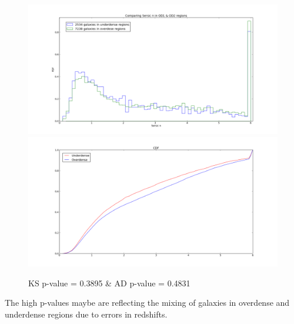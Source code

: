 \documentclass[a4paper,10pt]{article}
\begin{document}
\begin{figure}[ht]
 \centering
 \includegraphics[scale=0.3]{hist_sersicn_ODUD.png}
 \includegraphics[scale=0.3]{cdf_sersicn_ODUD.png}
 \caption{KS p-value = 0.3895 \& AD p-value = 0.4831}
\end{figure}

The high p-values maybe are reflecting the mixing of galaxies in overdense and underdense regions due to errors in redshifts.

\pagebreak
\end{document}
